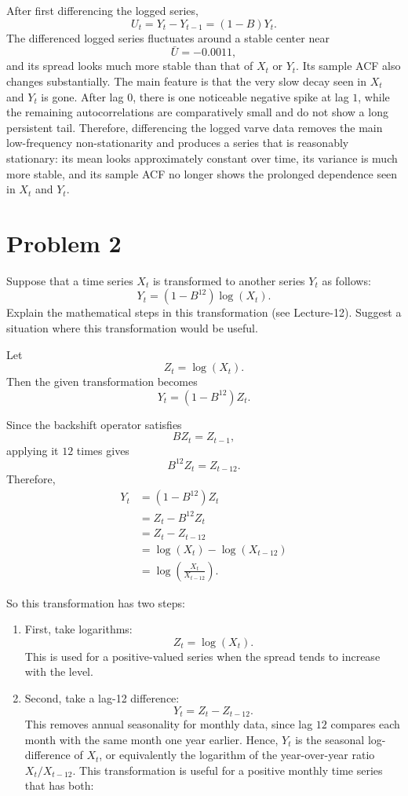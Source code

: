 \documentclass[
  10pt,
]{extarticle}
\begin{document}
After first differencing the logged series,
\[
U_t = Y_t - Y_{t-1} = (1-B)Y_t.
\]
The differenced logged series fluctuates around a stable center near
\[
\bar U = -0.0011,
\]
and its spread looks much more stable than that of \(X_t\) or \(Y_t\). Its sample ACF also changes substantially. The main feature is that the very slow decay seen in \(X_t\) and \(Y_t\) is gone. After lag \(0\), there is one noticeable negative spike at lag \(1\), while the remaining autocorrelations are comparatively small and do not show a long persistent tail. Therefore, differencing the logged varve data removes the main low-frequency non-stationarity and produces a series that is reasonably stationary: its mean looks approximately constant over time, its variance is much more stable, and its sample ACF no longer shows the prolonged dependence seen in \(X_t\) and \(Y_t\).

\newpage

\section{Problem 2}\label{problem-2}

\begin{problem}[Problem 2]
Suppose that a time series \(X_t\) is transformed to another series \(Y_t\) as follows:
\[
Y_t = (1-B^{12})\log(X_t).
\]
Explain the mathematical steps in this transformation (see Lecture-12). Suggest a situation where this transformation would be useful.
\end{problem}

Let
\[
Z_t = \log(X_t).
\]
Then the given transformation becomes
\[
Y_t = (1-B^{12})Z_t.
\]

Since the backshift operator satisfies
\[
BZ_t = Z_{t-1},
\]
applying it \(12\) times gives
\[
B^{12}Z_t = Z_{t-12}.
\]
Therefore,
\[
\begin{aligned}
Y_t
&= (1-B^{12})Z_t \\
&= Z_t - B^{12}Z_t \\
&= Z_t - Z_{t-12} \\
&= \log(X_t) - \log(X_{t-12}) \\
&= \log\left(\frac{X_t}{X_{t-12}}\right).
\end{aligned}
\]

So this transformation has two steps:

\begin{enumerate}
\def\labelenumi{\arabic{enumi}.}
\item
  First, take logarithms:
  \[
  Z_t = \log(X_t).
  \]
  This is used for a positive-valued series when the spread tends to increase with the level.
\item
  Second, take a lag-12 difference:
  \[
  Y_t = Z_t - Z_{t-12}.
  \]
  This removes annual seasonality for monthly data, since lag \(12\) compares each month with the same month one year earlier. Hence, \(Y_t\) is the seasonal log-difference of \(X_t\), or equivalently the logarithm of the year-over-year ratio \(X_t / X_{t-12}\). This transformation is useful for a positive monthly time series that has both:
\end{enumerate}
\end{document}
